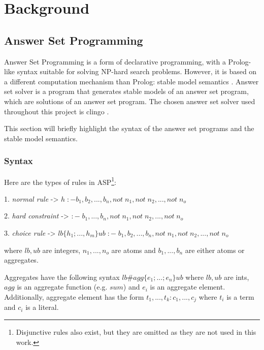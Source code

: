 \chapter{Background}


\section{Answer Set Programming}
\label{answer-set-programming}

Answer Set Programming  \cite{RefWorks:RefID:1-lifschitz2008answer} is a form of declarative programming, with a Prolog-like syntax suitable for solving NP-hard search problems.
However, it is based on a different computation mechanism than Prolog: stable model semantics \cite{RefWorks:RefID:21-fitting1992michael}.
Answer set solver is a program that generates stable models of an answer set program, which are solutions of an answer set program. 
The chosen answer set solver used throughout this project is clingo \cite{RefWorks:RefID:22-clingo}.

This section will briefly highlight the syntax of the answer set programs and the stable model semantics.

\subsection{Syntax}

Here are the types of rules in ASP\footnote{Disjunctive rules also exist, but they are omitted as they are not used in this work.}: 

 1. \emph{normal rule} -> $ h\; :- b_1, b_2, ..., b_n, not\; n_1, not\; n_2, ..., not\; n_o$
 
 2. \emph{hard constraint} -> $:- \; b_1, ..., b_n, not\; n_1, not\; n_2, ..., not\; n_o$
 
 3. \emph{choice rule} -> $lb\{h_1; ..., h_m\}ub\; :- \;  b_1, b_2, ..., b_n, not\; n_1, not\; n_2, ..., not\; n_o$
 
where $lb, ub$ are integers, $n_1,...,n_o$ are atoms and $b_1, ...,b_n$ are either atoms or aggregates.

Aggregates have the following syntax $lb\#agg\{e_1; ...; e_n\}ub$ where $lb, ub$ are ints, $agg$ is an aggregate function (e.g. $sum$) and $e_i$ is an aggregate element.
Additionally, aggregate element has the form  $t_1, ..., t_k : c_1, ..., c_j$ where $t_i$ is a term and $c_i$ is a literal.
 
